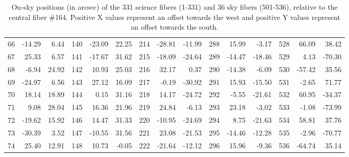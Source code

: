 \begin{table}[!h]
{\begin{tabular}{|r r r||r r r||r r r||r r r||r r r|}
66 & -14.29 &  6.44 & 140 & -23.09 & 22.25 & 214 & -28.81 & -11.99 & 288 &  15.99 &  -3.17 & 528 &  66.09 &  38.42 \\
67 &  25.33 &  6.57 & 141 & -17.67 & 31.62 & 215 & -18.09 & -24.64 & 289 & -14.47 & -18.46 & 529 &   4.13 & -70.30 \\
68 &  -6.94 & 24.92 & 142 &  10.93 & 25.03 & 216 &  32.17 &   0.37 & 290 & -14.38 &  -6.09 & 530 & -57.42 &  35.56 \\
69 & -24.97 &  6.56 & 143 &  27.12 & 16.09 & 217 &  -0.19 & -30.92 & 291 &  15.93 & -15.50 & 531 &  -2.65 &  71.77 \\
70 &  18.14 & 18.89 & 144 &   0.15 & 31.16 & 218 &  14.17 & -24.72 & 292 &  -5.55 & -21.61 & 532 &  60.95 & -34.37 \\
71 &   9.08 & 28.04 & 145 &  16.36 & 21.96 & 219 &  24.84 &  -6.13 & 293 &  23.18 &  -3.02 & 533 &  -1.08 & -73.99 \\
72 & -19.62 & 15.92 & 146 &  14.47 & 31.33 & 220 & -10.95 & -24.69 & 294 &   8.75 & -21.63 & 534 &  58.81 &  37.76 \\
73 & -30.39 &  3.52 & 147 & -10.55 & 31.56 & 221 &  23.08 & -21.53 & 295 & -14.46 & -12.28 & 535 &  -2.96 & -70.77 \\
74 &  25.40 & 12.91 & 148 &  10.73 & -0.05 & 222 & -21.64 & -12.12 & 296 &  15.96 &  -9.36 & 536 & -64.74 &  35.14 \\
\hline
\end{tabular}
}
\caption{\tiny On-sky positions (in arcsec) of the 331 science fibers (1-331) and 36 sky 
fibers (501-536), relative to the central fiber \#164. Positive X values represent an 
offset towards the west and positive Y values represent an offset towards the south.}
\label{tab:FibPos}
\end{table}
